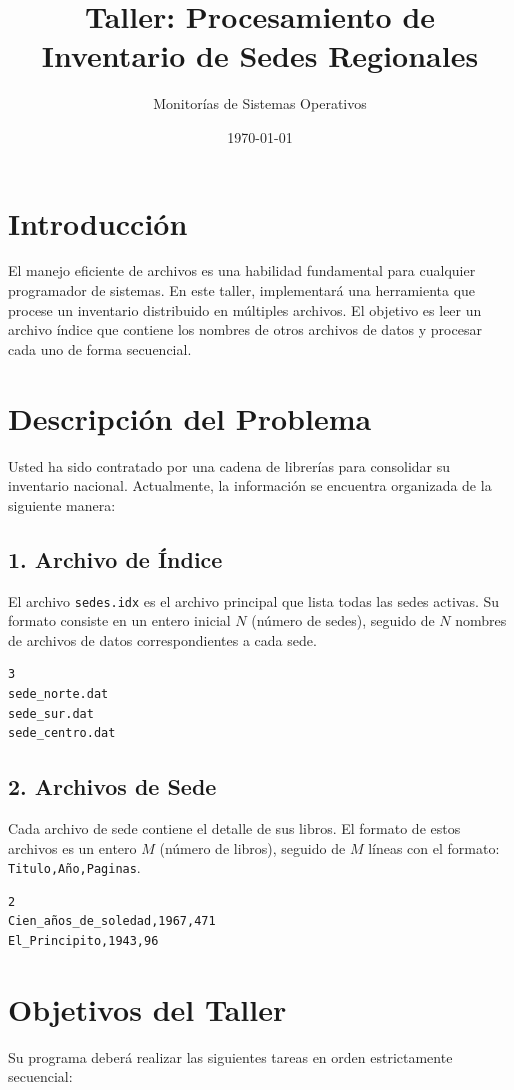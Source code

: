 \documentclass[12pt,a4paper]{article}
\title{\textbf{Taller: Procesamiento de Inventario de Sedes Regionales}}
\author{Monitorías de Sistemas Operativos}
\date{\today}
\begin{document}
\maketitle

\section*{Introducción}
El manejo eficiente de archivos es una habilidad fundamental para cualquier programador de sistemas. En este taller, implementará una herramienta que procese un inventario distribuido en múltiples archivos. El objetivo es leer un archivo índice que contiene los nombres de otros archivos de datos y procesar cada uno de forma secuencial.

\section*{Descripción del Problema}
Usted ha sido contratado por una cadena de librerías para consolidar su inventario nacional. Actualmente, la información se encuentra organizada de la siguiente manera:

\subsection*{1. Archivo de Índice }
El archivo \texttt{sedes.idx} es el archivo principal que lista todas las sedes activas. Su formato consiste en un entero inicial $N$ (número de sedes), seguido de $N$ nombres de archivos de datos correspondientes a cada sede.
\begin{lstlisting}[title=Ejemplo de sedes.idx]
3
sede_norte.dat
sede_sur.dat
sede_centro.dat
\end{lstlisting}

\subsection*{2. Archivos de Sede}
Cada archivo de sede contiene el detalle de sus libros. El formato de estos archivos es un entero $M$ (número de libros), seguido de $M$ líneas con el formato: \texttt{Titulo,Año,Paginas}.
\begin{lstlisting}[title=Ejemplo de sede\_norte.dat]
2
Cien_años_de_soledad,1967,471
El_Principito,1943,96
\end{lstlisting}

\section*{Objetivos del Taller}
Su programa deberá realizar las siguientes tareas en orden estrictamente secuencial:
\end{document}
